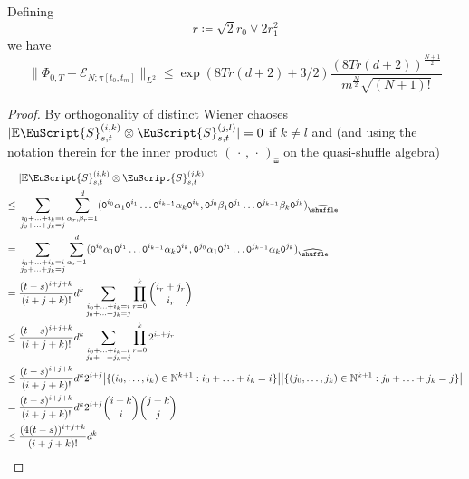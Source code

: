 \documentclass{article}
\def\Sig{\EuScript{S}}
\numberwithin{equation}{section}
\theoremstyle{definition}
\theoremstyle{remark}
\begin{document}
\begin{theorem}\label{thm:L2error}
Defining 
\[
r \coloneqq \sqrt 2 r_0 \vee 2r_1^2
\]
we have
\[
\|\Phi_{0,T} - \mathcal E_{N;\pi[t_0,t_m]}\|_{L^2} \leq \exp(8Tr(d+2)+3/2)\frac{(8Tr(d+2))^{\frac{N+1}{2}}}{m^{\frac{N}{2}}\sqrt{(N+1)!}} 
\]
\end{theorem}
\begin{proof}

By orthogonality of distinct Wiener chaoses $|\mathbb E\Sig^{(i,k)}_{s,t} \otimes \Sig^{(j,l)}_{s,t}| = 0$ if $k \neq l$ and \cite[4.14]{orth} (and using the notation therein for the inner product $(\,\cdot\,,\,\cdot\,)_{\widehat \shuffle}$ on the quasi-shuffle algebra)
\begin{align*}
&|\mathbb E\Sig^{(i,k)}_{s,t}\otimes\Sig^{(j,k)}_{s,t}| \\
\leq{} &\sum_{\substack{i_0 + \ldots + i_k = i \\ j_0 + \ldots + j_k = j}} \sum_{\alpha_r,\beta_r = 1}^d (\texttt{0}^{i_0}\alpha_1 \texttt{0}^{i_1} \ldots \texttt{0}^{i_{k-1}}\alpha_k \texttt{0}^{i_k}, \texttt{0}^{j_0}\beta_1 \texttt{0}^{j_1} \ldots \texttt{0}^{j_{k-1}}\beta_k \texttt{0}^{j_k})_{\widehat \shuffle} \\
={} &\sum_{\substack{i_0 + \ldots + i_k = i \\ j_0 + \ldots + j_k = j}} \sum_{\alpha_r = 1}^d (\texttt{0}^{i_0}\alpha_1 \texttt{0}^{i_1} \ldots \texttt{0}^{i_{k-1}}\alpha_k \texttt{0}^{i_k}, \texttt{0}^{j_0}\alpha_1 \texttt{0}^{j_1} \ldots \texttt{0}^{j_{k-1}}\alpha_k \texttt{0}^{j_k})_{\widehat \shuffle} \\
={} & \frac{(t-s)^{i+j+k}}{(i+j+k)!} d^k \sum_{\substack{i_0 + \ldots + i_k = i \\ j_0 + \ldots + j_k = j}} \prod_{r = 0}^k \binom{i_r + j_r}{i_r} \\
\leq{} & \frac{(t-s)^{i+j+k}}{(i+j+k)!} d^k \sum_{\substack{i_0 + \ldots + i_k = i \\ j_0 + \ldots + j_k = j}} \prod_{r = 0}^k 2^{i_r + j_r} \\
\leq{} & \frac{(t-s)^{i+j+k}}{(i+j+k)!} d^k 2^{i + j} \big|\{(i_0, \ldots, i_k) \in \mathbb N^{k+1} : i_0 + \ldots +i_k = i\}\big|  \big|\{(j_0, \ldots, j_k) \in \mathbb N^{k+1} : j_0 + \ldots +j_k = j\}\big| \\
={} & \frac{(t-s)^{i+j+k}}{(i+j+k)!} d^k 2^{i + j} \binom{i+k}{i}\binom{j+k}{j} \\
\leq{} & \frac{(4(t-s))^{i+j+k}}{(i+j+k)!} d^k
\end{align*}

\end{proof}
\end{document}
